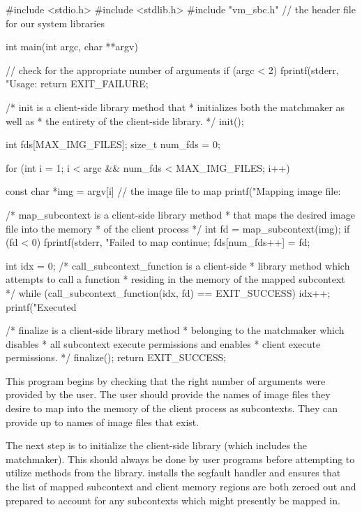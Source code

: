\begin{ccode}
#include <stdio.h>
#include <stdlib.h>
#include "vm_sbc.h" // the header file for our system libraries

int main(int argc, char **argv) {

	// check for the appropriate number of arguments
	if (argc < 2) {
		fprintf(stderr, "Usage: %
		return EXIT_FAILURE;
	}

	/* init is a client-side library method that
	 * initializes both the matchmaker as well as 
	 * the entirety of the client-side library.
	 */
	init();

	int fds[MAX_IMG_FILES];
	size_t num_fds = 0;

	for (int i = 1; i < argc && num_fds < MAX_IMG_FILES; i++) {
		const char *img = argv[i] // the image file to map
		printf("Mapping image file: %

		/* map_subcontext is a client-side library method
		 * that maps the desired image file into the memory
		 * of the client process
		 */
		int fd = map_subcontext(img);
		if (fd < 0) {
			fprintf(stderr, "Failed to map %
			continue;
		}
		fds[num_fds++] = fd;

		int idx = 0;
		/* call_subcontext_function is a client-side
		 * library method which attempts to call a function
		 * residing in the memory of the mapped subcontext
		 */
		while (call_subcontext_function(idx, fd) == EXIT_SUCCESS) idx++;
		printf("Executed %

	}

	/* finalize is a client-side library method
	 * belonging to the matchmaker which disables
	 * all subcontext execute permissions and enables
	 * client execute permissions.
	 */
	finalize();
	return EXIT_SUCCESS;
}
\end{ccode}

This program begins by checking that the right number of arguments were provided by the user. The user should provide the names of image files they desire to map into the memory of the client process as subcontexts. They can provide up to  names of image files that exist.

The next step is to initialize the client-side library (which includes the matchmaker). This should always be done by user programs before attempting to utilize methods from the library.  installs the segfault handler and ensures that the list of mapped subcontext and client memory regions are both zeroed out and prepared to account for any subcontexts which might presently be mapped in.

